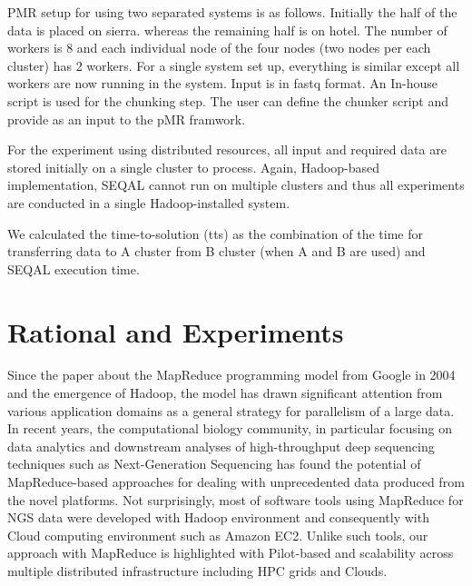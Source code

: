 \documentclass{sig-alternate}
\begin{document}
PMR setup for using two separated systems is as follows.  Initially the half of the data is placed on sierra. whereas the remaining half is on hotel. The number of workers is 8 and each individual node of the four nodes (two nodes per each cluster) has 2 workers.  For a single system set up, everything is similar except all workers are now running in the system.  Input is in fastq format. An In-house script is used for the chunking step. The user can define the chunker script and provide as an input to the pMR framwork.  
 
 
For the experiment using distributed resources, all input and required data are stored initially on a single cluster to process.  Again, Hadoop-based implementation, SEQAL cannot run on multiple clusters and thus all experiments are conducted in a single Hadoop-installed system.

We calculated the time-to-solution (tts) as the combination of the time for transferring data to A cluster from B cluster (when A and B are used) and SEQAL execution time. 
 


\section{Rational and Experiments}



Since the paper about the MapReduce programming model from Google in 2004\cite{mapreduce-2004-dean} and the emergence of Hadoop, the model has drawn significant attention from various application domains as a general strategy for parallelism of a large data.  In recent years, the computational biology community, in particular focusing on data analytics and downstream analyses of high-throughput deep sequencing techniques such as Next-Generation Sequencing has found the potential of MapReduce-based approaches for dealing with unprecedented data produced from the novel platforms\cite{schatz-nature-biotech-2010}.  Not surprisingly, most of software tools using MapReduce for NGS data were developed with Hadoop environment and consequently with Cloud computing environment such as Amazon EC2.  Unlike such tools, our approach with MapReduce is highlighted with Pilot-based and scalability across multiple distributed infrastructure including HPC grids and Clouds.  
\end{document}
